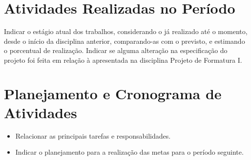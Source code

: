 \documentclass[a4paper,12pt,font=plain,header=plain]{abnt}
\begin{document}
  \section{Atividades Realizadas no Período}
    Indicar o estágio atual dos trabalhos, considerando o já realizado até o momento, desde o início da disciplina anterior, comparando-as com o previsto, e estimando o porcentual de realização. Indicar se alguma alteração na especificação do projeto foi feita em relação à apresentada na disciplina Projeto de Formatura I.

  \section{Planejamento e Cronograma de Atividades}

    \begin{itemize}
      \item{
        Relacionar as principais tarefas e responsabilidades.
      }
      \item{
        Indicar o planejamento para a realização das metas para o período seguinte.
      }
    \end{itemize}
\end{document}
